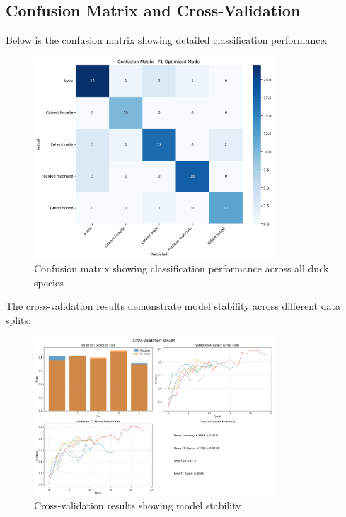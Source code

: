 \documentclass[12pt,a4paper]{article}
\begin{document}
\subsection{Confusion Matrix and Cross-Validation}

Below is the confusion matrix showing detailed classification performance:

\begin{figure}[H]
    \centering
    \includegraphics[width=0.8\textwidth]{../../output/best_model_duck_classification_f1_optimized_20250608_195712/plots/confusion_matrix.png}
    \caption{Confusion matrix showing classification performance across all duck species}
    \label{fig:confusion_matrix}
\end{figure}

The cross-validation results demonstrate model stability across different data splits:

\begin{figure}[H]
    \centering
    \includegraphics[width=0.8\textwidth]{../../output/best_model_duck_classification_f1_optimized_20250608_195712/plots/cross_validation_results.png}
    \caption{Cross-validation results showing model stability}
    \label{fig:cross_validation}
\end{figure}
\end{document}
